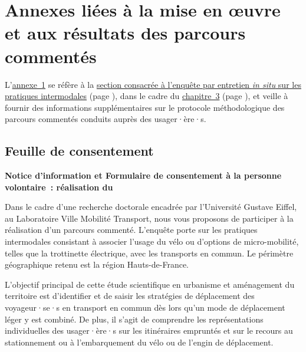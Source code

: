     \setcounter{section}{0}
\chapter{Annexes liées à la mise en œuvre et aux résultats des parcours commentés}
    \label{annexes:parcours-commentes}

L'\hyperref[annexes:parcours-commentes]{annexe~\ref{annexes:parcours-commentes}} se réfère à la \hyperref[chap3:parcours-commente]{section consacrée à l'enquête par entretien \textsl{in situ} sur les pratiques intermodales} (page \pageref{chap3:parcours-commente}), dans le cadre du \hyperref[chap3:titre]{chapitre~3} (page \pageref{chap3:titre}), et veille à fournir des informations supplémentaires sur le protocole méthodologique des parcours commentés conduits auprès des usager·ère·s.%

    \setcounter{tocdepth}{2}
    \renewcommand{\localcontentsname}{Structure de l'annexe~\ref{annexes:parcours-commentes}}
\localtableofcontents

    \newpage
\section{Feuille de consentement}
    \label{annexes:consentement-parcours-commentes}

\textbf{Notice d’information et Formulaire de consentement à la personne volontaire~: réalisation du }

Dans le cadre d’une recherche doctorale encadrée par l’Université Gustave Eiffel, au Laboratoire Ville Mobilité Transport, nous vous proposons de participer à la réalisation d’un parcours commenté. L’enquête porte sur les pratiques intermodales consistant à associer l’usage du vélo ou d’options de micro-mobilité, telles que la trottinette électrique, avec les transports en commun. Le périmètre géographique retenu est la région Hauts-de-France.%

L’objectif principal de cette étude scientifique en urbanisme et aménagement du territoire est d’identifier et de saisir les stratégies de déplacement des voyageur·se·s en transport en commun dès lors qu’un mode de déplacement léger y est combiné. De plus, il s’agit de comprendre les représentations individuelles des usager·ère·s sur les itinéraires empruntés et sur le recours au stationnement ou à l’embarquement du vélo ou de l'engin de déplacement.%

